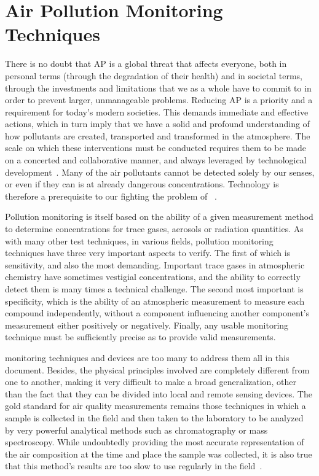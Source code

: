 
\section{Air Pollution Monitoring Techniques}%
\label{sec:intro_air_pollution_monitoring_techniques}

There is no doubt that \gls{AP} is a global threat that affects
everyone, both in personal terms (through the degradation of their
health) and in societal terms, through the investments and limitations
that we as a whole have to commit to in order to prevent larger,
unmanageable problems. Reducing \gls{AP} is a priority and a requirement
for today's modern societies. This demands immediate and effective
actions, which in turn imply that we have a solid and profound
understanding of how pollutants are created, transported and transformed
in the atmosphere. The scale on which these interventions must be
conducted requires them to be made on a concerted and collaborative
manner, and always leveraged by technological
development~\cite{EEA2019}. Many of the air pollutants cannot be
detected solely by our senses, or even if they can is at already
dangerous concentrations. Technology is therefore a prerequisite to our
fighting the problem of ~\cite{Vallero2014}.

Pollution monitoring is itself based on the ability of a given
measurement method to determine concentrations for trace gases, aerosols
or radiation quantities. As with many other test techniques, in various
fields, pollution monitoring techniques have three very important
aspects to verify. The first of which is sensitivity, and also the most
demanding. Important trace gases in atmospheric chemistry have sometimes
vestigial concentrations, and the ability to correctly detect them is
many times a technical challenge. The second most important is
specificity, which is the ability of an atmospheric measurement to
measure each compound independently, without a component influencing
another component's measurement either positively or negatively.
Finally, any usable monitoring technique must be sufficiently precise as
to provide valid measurements.

 monitoring techniques and devices are too many to address
them all in this document. Besides, the physical principles involved are
completely different from one to another, making it very difficult to
make a broad generalization, other than the fact that they can be
divided into local and remote sensing devices. The gold standard for air
quality measurements remains those techniques in which a sample is
collected in the field and then taken to the laboratory to be analyzed
by very powerful analytical methods such as chromatography or mass
spectroscopy. While undoubtedly providing the most accurate
representation of the air composition at the time and place the sample
was collected, it is also true that this method's results are too slow
to use regularly in the field~\cite{Vallero2014, Clark1997, Bishop1996}.

